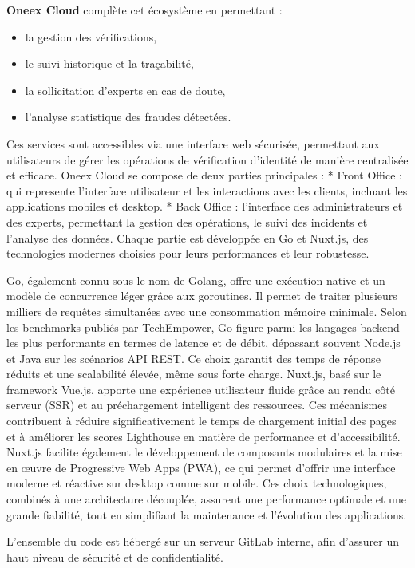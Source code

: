 \textbf{Oneex Cloud} complète cet écosystème en permettant :

\begin{itemize}
	\item la gestion des vérifications,
	\item le suivi historique et la traçabilité,
	\item la sollicitation d’experts en cas de doute,
	\item l’analyse statistique des fraudes détectées.
\end{itemize}

Ces services sont accessibles via une interface web sécurisée, permettant aux utilisateurs de gérer les opérations de vérification d’identité de manière centralisée et efficace.
Oneex Cloud se compose de deux parties principales :
* Front Office : qui represente l'interface utilisateur et les interactions avec les clients, incluant les applications mobiles et desktop.
* Back Office : l'interface des administrateurs et des experts, permettant la gestion des opérations, le suivi des incidents et l'analyse des données.
Chaque partie est développée en Go et Nuxt.js, des technologies modernes choisies pour leurs performances et leur robustesse.

Go, également connu sous le nom de Golang, offre une exécution native et un modèle de concurrence léger grâce aux goroutines. Il permet de traiter plusieurs milliers de requêtes simultanées avec une consommation mémoire minimale. Selon les benchmarks publiés par TechEmpower, Go figure parmi les langages backend les plus performants en termes de latence et de débit, dépassant souvent Node.js et Java sur les scénarios API REST. Ce choix garantit des temps de réponse réduits et une scalabilité élevée, même sous forte charge.
Nuxt.js, basé sur le framework Vue.js, apporte une expérience utilisateur fluide grâce au rendu côté serveur (SSR) et au préchargement intelligent des ressources. Ces mécanismes contribuent à réduire significativement le temps de chargement initial des pages et à améliorer les scores Lighthouse en matière de performance et d’accessibilité. Nuxt.js facilite également le développement de composants modulaires et la mise en œuvre de Progressive Web Apps (PWA), ce qui permet d’offrir une interface moderne et réactive sur desktop comme sur mobile.
Ces choix technologiques, combinés à une architecture découplée, assurent une performance optimale et une grande fiabilité, tout en simplifiant la maintenance et l’évolution des applications.

L’ensemble du code est hébergé sur un serveur GitLab interne, afin d’assurer un haut niveau de sécurité et de confidentialité.
